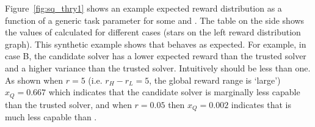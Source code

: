 Figure~\ref{fig:sq_thry1} shows an example expected reward distribution as a function of a generic task parameter for some \solvetrust{} and \solvecand{}. %
The table on the side shows the values of \xQ{} calculated for different cases (stars on the left reward distribution graph). 
This synthetic example shows that \xQ{} behaves as expected.
For example, in case B, the candidate solver has a lower expected reward than the trusted solver and a higher variance than the trusted solver. Intuitively \xQ{} should be less than one. As shown when $r=5$ (i.e. $r_H-r_L=5$, the global reward range is `large') $x_Q=0.667$ which indicates that the candidate solver is marginally less capable than the trusted solver, and when $r=0.05$ then $x_Q=0.002$ indicates that \solvecand{} is much less capable than \solvetrust. 
